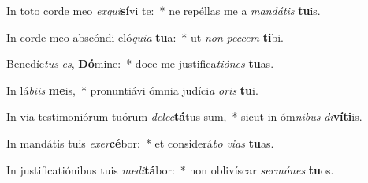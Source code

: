 \item In toto corde meo \textit{ex}\textit{qui}\textbf{sí}vi te:~* ne repéllas me a \textit{man}\textit{dá}\textit{tis} \textbf{tu}is.
\item In corde meo abscóndi eló\textit{qui}\textit{a} \textbf{tu}a:~* ut \textit{non} \textit{pec}\textit{cem} \textbf{ti}bi.
\item Benedíc\textit{tus} \textit{es}, \textbf{Dó}mine:~* doce me justifica\textit{ti}\textit{ó}\textit{nes} \textbf{tu}as.
\item In lá\textit{bi}\textit{is} \textbf{me}is,~* pronuntiávi ómnia judíci\textit{a} \textit{o}\textit{ris} \textbf{tu}i.
\item In via testimoniórum tuórum \textit{de}\textit{lec}\textbf{tá}tus sum,~* sicut in óm\textit{ni}\textit{bus} \textit{di}\textbf{ví}\textbf{ti}is.
\item In mandátis tuis \textit{ex}\textit{er}\textbf{cé}bor:~* et considerá\textit{bo} \textit{vi}\textit{as} \textbf{tu}as.
\item In justificatiónibus tuis \textit{me}\textit{di}\textbf{tá}bor:~* non oblivíscar \textit{ser}\textit{mó}\textit{nes} \textbf{tu}os.
